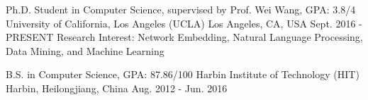 \begin{cventries}
  \cventry
    {Ph.D. Student in Computer Science, supervised by Prof. Wei Wang, GPA: 3.8/4}
    {University of California, Los Angeles (UCLA)}
    {Los Angeles, CA, USA}
    {Sept. 2016 - PRESENT}
    {Research Interest: Network Embedding, Natural Language Processing, Data Mining, and Machine Learning}
  
  \vspace{-0.5em}
  
  \cventry
    {B.S. in Computer Science, GPA: 87.86/100}
    {Harbin Institute of Technology (HIT)}
    {Harbin, Heilongjiang, China}
    {Aug. 2012 - Jun. 2016}{}
\end{cventries}
